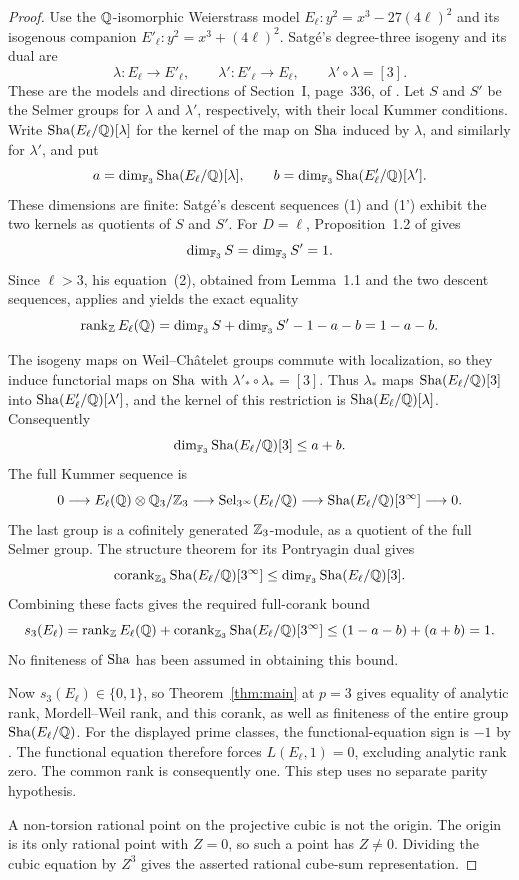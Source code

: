 \begin{proof}
Use the $\mathbb Q$-isomorphic Weierstrass model
$E_\ell:y^2=x^3-27(4\ell)^2$ and its isogenous companion
$E'_\ell:y^2=x^3+(4\ell)^2$. Satg\'e's degree-three isogeny and its
dual are
\[
 \lambda:E_\ell\longrightarrow E'_\ell,\qquad
 \lambda':E'_\ell\longrightarrow E_\ell,\qquad
 \lambda'\circ\lambda=[3].
\]
These are the models and directions of Section~I, page~336, of
\citet{Satge1987CubeSums}. Let $S$ and $S'$ be the Selmer groups for
$\lambda$ and $\lambda'$, respectively, with their local Kummer
conditions. Write $\operatorname{Sha}(E_\ell/\mathbb Q)[\lambda]$ for the kernel of the map
on $\operatorname{Sha}$ induced by $\lambda$, and similarly for $\lambda'$, and put
\[
 a=\dim_{\mathbb F_3}\operatorname{Sha}(E_\ell/\mathbb Q)[\lambda],\qquad
 b=\dim_{\mathbb F_3}\operatorname{Sha}(E'_\ell/\mathbb Q)[\lambda'].
\]
These dimensions are finite: Satg\'e's descent sequences (1) and (1')
exhibit the two kernels as quotients of $S$ and $S'$.
For $D=\ell$, Proposition~1.2 of \citet{Satge1987CubeSums} gives
\[
 \dim_{\mathbb F_3}S=\dim_{\mathbb F_3}S'=1.
\]
Since $\ell>3$, his equation~(2), obtained from Lemma~1.1 and the two
descent sequences, applies and yields the exact equality
\[
 \operatorname{rank}_\mathbb Z E_\ell(\mathbb Q)
 =\dim_{\mathbb F_3}S+\dim_{\mathbb F_3}S'-1-a-b
 =1-a-b.
\]

The isogeny maps on Weil--Ch\^atelet groups commute with localization,
so they induce functorial maps on $\operatorname{Sha}$ with
$\lambda'_*\circ\lambda_*=[3]$. Thus $\lambda_*$ maps
$\operatorname{Sha}(E_\ell/\mathbb Q)[3]$ into $\operatorname{Sha}(E'_\ell/\mathbb Q)[\lambda']$, and the kernel
of this restriction is $\operatorname{Sha}(E_\ell/\mathbb Q)[\lambda]$. Consequently
\[
 \dim_{\mathbb F_3}\operatorname{Sha}(E_\ell/\mathbb Q)[3]\leq a+b.
\]
The full Kummer sequence is
\[
 0\longrightarrow E_\ell(\mathbb Q)\otimes\mathbb Q_3/\mathbb Z_3
 \longrightarrow \operatorname{Sel}_{3^\infty}(E_\ell/\mathbb Q)
 \longrightarrow \operatorname{Sha}(E_\ell/\mathbb Q)[3^\infty]
 \longrightarrow 0.
\]
The last group is a cofinitely generated $\mathbb Z_3$-module, as a quotient
of the full Selmer group. The structure theorem for its Pontryagin
dual gives
\[
 \operatorname{corank}_{\mathbb Z_3}\operatorname{Sha}(E_\ell/\mathbb Q)[3^\infty]
 \leq \dim_{\mathbb F_3}\operatorname{Sha}(E_\ell/\mathbb Q)[3].
\]
Combining these facts gives the required full-corank bound
\[
 s_3(E_\ell)
 =\operatorname{rank}_\mathbb Z E_\ell(\mathbb Q)
  +\operatorname{corank}_{\mathbb Z_3}\operatorname{Sha}(E_\ell/\mathbb Q)[3^\infty]
 \leq (1-a-b)+(a+b)=1.
\]
No finiteness of $\operatorname{Sha}$ has been assumed in obtaining this bound.

Now $s_3(E_\ell)\in\{0,1\}$, so Theorem~\ref{thm:main} at $p=3$
gives equality of analytic rank, Mordell--Weil rank, and this corank,
as well as finiteness of the entire group $\operatorname{Sha}(E_\ell/\mathbb Q)$.
For the displayed prime classes, the functional-equation sign is $-1$
by \citet[Section~1.1, equation~(1.1.3)]{DasguptaVoight2018}.
The functional equation therefore forces $L(E_\ell,1)=0$, excluding
analytic rank zero. The common rank is consequently one. This step
uses no separate parity hypothesis.

A non-torsion rational point on the projective cubic is not the origin.
The origin is its only rational point with $Z=0$, so such a point has
$Z\ne0$. Dividing the cubic equation by $Z^3$ gives the asserted
rational cube-sum representation.
\end{proof}

